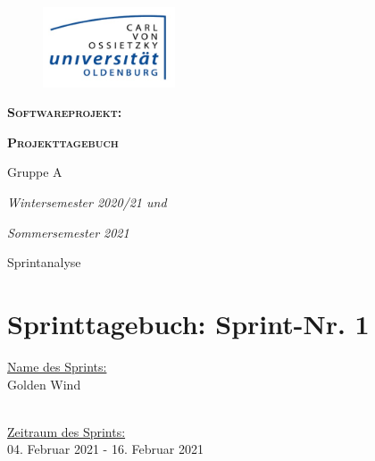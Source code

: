 \documentclass[12pt,a4paper, oneside]{article}
\author{Uni Oldenburg, SWP2020 Gruppe A}
\begin{document}
    \begin{titlepage}
        \pagestyle{empty}
        \begin{center}

            \begin{figure}[h]
                \centering
                \includegraphics[width=0.35\textwidth]{img/Logo.jpg}
            \end{figure}

            \bigskip \bigskip \noindent
            \textsc{\textbf{\LARGE Softwareprojekt:}} \par \bigskip \noindent
            \textsc{\textbf{\LARGE Projekttagebuch}}


            \par \bigskip \bigskip \bigskip \bigskip \bigskip \noindent
            {\Large Gruppe A} \par \medskip \noindent

            \par \bigskip \bigskip \bigskip \bigskip \bigskip \bigskip \noindent
            \textit{\Large Wintersemester 2020/21 und} \par \noindent
            \textit{\Large Sommersemester 2021}

            \par \bigskip \bigskip \bigskip \bigskip \bigskip \bigskip \noindent
            \par \bigskip \bigskip \bigskip \noindent
            {\Large Sprintanalyse} \par \medskip \noindent

        \end{center}
    \end{titlepage}

    \tableofcontents
    \pagebreak


    \section{Sprinttagebuch: Sprint-Nr. 1}
    \underline{Name des Sprints:}
    \\
    Golden Wind

    \noindent
    \\
    \underline{Zeitraum des Sprints:}
    \\
    04. Februar 2021 - 16. Februar 2021
\end{document}
